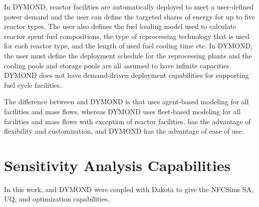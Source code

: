 In DYMOND, reactor facilities are automatically deployed to 
meet a user-defined power demand and the user can define 
the targeted shares of energy for up to five reactor types. 
The user also defines the fuel loading model used to calculate 
reactor spent fuel compositions, the type of reprocessing 
technology that is used for each reactor type, and the length 
of used fuel cooling time etc. 
In DYMOND, the user must define the deployment schedule for 
the reprocessing plants and the cooling pools and storage pools 
are all assumed to have infinite capacities. 
DYMOND does not have demand-driven deployment capabilities for 
supporting fuel cycle facilities. 

The difference between \Cyclus and DYMOND is that \Cyclus uses 
agent-based modeling for all facilities and mass flows, 
whereas DYMOND uses fleet-based modeling for all facilities and 
mass flows with exception of reactor facilities. 
\Cyclus has the advantage of flexibility and customization, 
and DYMOND has the advantage of ease of use. 

\section{Sensitivity Analysis Capabilities}
In this work, \Cyclus and DYMOND were coupled with Dakota 
\cite{eldred_dakota_2010} to give the \glspl{NFCSim} \gls{SA}, 
\gls{UQ}, and optimization capabilities. 